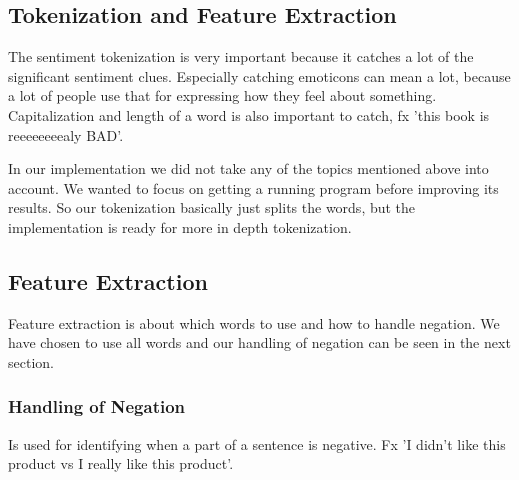 \subsection{Tokenization and Feature Extraction}
The sentiment tokenization is very important because it catches a lot of the significant sentiment clues.
Especially catching emoticons can mean a lot, because a lot of people use that for expressing how they feel about something.
Capitalization and length of a word is also important to catch, fx 'this book is reeeeeeeealy BAD'.

In our implementation we did not take any of the topics mentioned above into account.
We wanted to focus on getting a running program before improving its results.
So our tokenization basically just splits the words, but the implementation is ready for more in depth tokenization.

\subsection{Feature Extraction}
Feature extraction is about which words to use and how to handle negation.
We have chosen to use all words and our handling of negation can be seen in the next section.

\subsubsection{Handling of Negation}
Is used for identifying when a part of a sentence is negative.
Fx 'I didn't like this product vs I really like this product'.
